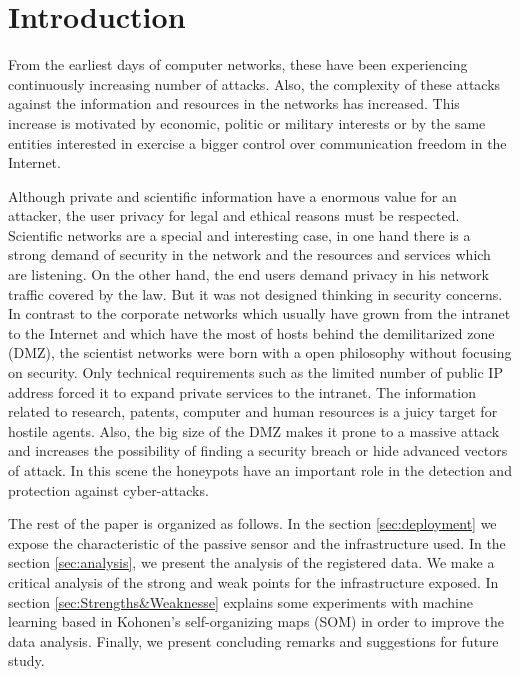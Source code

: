 \documentclass[a4paper]{llncs}
\begin{document}
\section{Introduction}
From the earliest days of computer networks, these have been experiencing continuously increasing number of attacks\cite{esset-tendencias,cni-ccn-tendencias-2014,cni-ccn-tendencias-2015}. Also, the complexity of these attacks against the information and resources in the networks has increased. This increase is motivated by  economic, politic or military interests or by the same entities interested in exercise a bigger control over communication freedom in the Internet\cite{cni-ccn-tendencias-2015,cisco-2014}.

Although private and scientific information have a enormous value for an attacker, the user privacy for legal and ethical reasons must be respected. Scientific networks are a special and interesting case, in one hand there is a strong demand of security in the network and the resources and services which are listening. On the other hand, the end users demand privacy in his network traffic covered by the law. But it was not designed thinking in security concerns\cite{iris-proyecto}. In contrast to the corporate networks which usually have grown from the intranet to the Internet and which have the most of hosts behind the demilitarized zone (DMZ), the scientist networks were born with a open philosophy without focusing on security\cite{iris-proyecto}. Only technical requirements such as the limited number of public IP address forced it to expand private services to the intranet. The information related to research, patents, computer and human resources is a juicy target for hostile agents. Also, the big size of the DMZ makes it prone to a massive attack and increases the possibility of finding a security breach or hide advanced vectors of attack. In this scene the honeypots have an important role in the detection and protection against cyber-attacks.

The rest of the paper is organized as follows. In the section \ref{sec:deployment} we expose the characteristic of the passive sensor and the infrastructure used. In the section \ref{sec:analysis}, we present the analysis of the registered data. We make a critical analysis of the strong and weak points for the infrastructure exposed. In section \ref{sec:Strengths&Weaknesse} explains some experiments with machine learning based in Kohonen's self-organizing maps (SOM)\cite{kohonen-1990} in order to improve the data analysis. Finally, we present concluding remarks and suggestions for future study.
\end{document}
